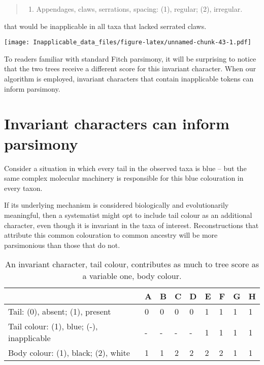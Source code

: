 \documentclass[]{book}
\providecommand{\tightlist}{%
  \setlength{\itemsep}{0pt}\setlength{\parskip}{0pt}}
\theoremstyle{definition}
\theoremstyle{definition}
\theoremstyle{definition}
\theoremstyle{remark}
\begin{document}
\begin{quote}
\begin{enumerate}
\def\labelenumi{\arabic{enumi}.}
\setcounter{enumi}{4}
\tightlist
\item
  Appendages, claws, serrations, spacing: (1), regular; (2), irregular.
\end{enumerate}
\end{quote}

that would be inapplicable in all taxa that lacked serrated claws.

\texttt{[image: Inapplicable\_data\_files/figure-latex/unnamed-chunk-43-1.pdf]}

To readers familiar with standard Fitch parsimony, it will be surprising
to notice that the two trees receive a different score for this
invariant character. When our algorithm is employed, invariant
characters that contain inapplicable tokens can inform parsimony.

\section{Invariant characters can inform
parsimony}\label{invariant-characters-can-inform-parsimony}

Consider a situation in which every tail in the observed taxa is blue --
but the same complex molecular machinery is responsible for this blue
colouration in every taxon.

If its underlying mechanism is considered biologically and
evolutionarily meaningful, then a systematist might opt to include tail
colour as an additional character, even though it is invariant in the
taxa of interest. Reconstructions that attribute this common colouration
to common ancestry will be more parsimonious than those that do not.

\begin{table}

\caption{\label{tab:unnamed-chunk-44}An invariant character, tail colour, contributes as much to tree score as a variable one, body colour.}
\centering
\begin{tabular}[t]{l|l|l|l|l|l|l|l|l}
\hline
  & A & B & C & D & E & F & G & H\\
\hline
Tail: (0), absent; (1), present & 0 & 0 & 0 & 0 & 1 & 1 & 1 & 1\\
\hline
Tail colour: (1), blue; (-), inapplicable & - & - & - & - & 1 & 1 & 1 & 1\\
\hline
Body colour: (1), black; (2), white & 1 & 1 & 2 & 2 & 2 & 2 & 1 & 1\\
\hline
\end{tabular}
\end{table}
\end{document}
